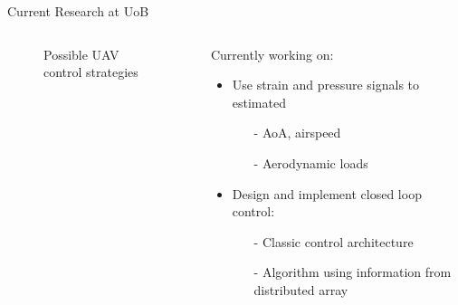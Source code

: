\documentclass[aspectratio=169]{beamer}            %
\begin{document}
\begin{frame}{Current Research at UoB}

  \vspace{-1.5em}
	\begin{columns}
	  \begin{column}{0.6\textwidth}
		  \begin{figure}[!htb]
        \centering
				
				\caption{Possible UAV control strategies}
				\label{fig:ANN_UAVCtrl_BlockDiagram}
      \end{figure}
		\end{column}
    \begin{column}{0.4\textwidth}
		  Currently working on:
      \pause
      \begin{itemize}[<+->]
        \item{Use strain and pressure signals to estimated}
			  \begin{itemize}[<+->]
			    \item[-]{AoA, airspeed}
          \item[-]{Aerodynamic loads}
			  \end{itemize}
		    \item{Design and implement closed loop control:}
			  \begin{itemize}[<+->]
			    \item[-]{Classic control architecture}
          \item[-]{Algorithm using information from distributed array}
			  \end{itemize}
      \end{itemize}
		\end{column}
	\end{columns}

\end{frame}

\end{document}
